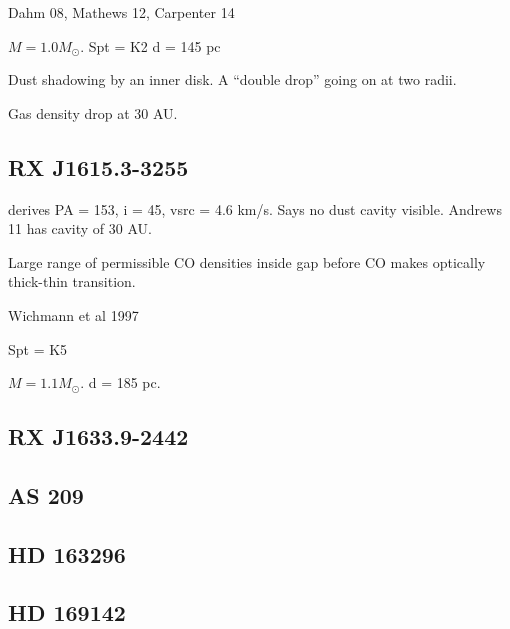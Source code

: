 \documentclass[twocolumn]{aastex6}
\begin{document}
Dahm 08, Mathews 12, Carpenter 14

$M = 1.0 M_\odot$.
Spt = K2
d = 145 pc

Dust shadowing by an inner disk. A ``double drop'' going on at two radii.

Gas density drop at 30 AU.

\subsection{RX J1615.3-3255}
\citep{vandermarel15} derives PA = 153, i = 45, vsrc = 4.6 km/s. Says no dust cavity visible. Andrews 11 has cavity of 30 AU.

Large range of permissible CO densities inside gap before CO makes optically thick-thin transition.

\citep{andrews11}
Wichmann et al 1997

Spt = K5

$M = 1.1 M_\odot$.
d = 185 pc.

\subsection{RX J1633.9-2442}

\subsection{AS 209}

\subsection{HD 163296}

\subsection{HD 169142}
\end{document}
